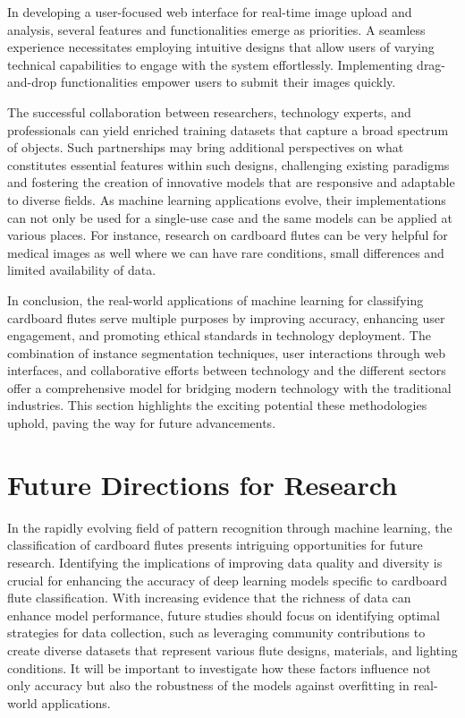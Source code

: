 In developing a user-focused web interface for real-time image upload and analysis, several features and functionalities emerge as priorities. A seamless experience necessitates employing intuitive designs that allow users of varying technical capabilities to engage with the system effortlessly. Implementing drag-and-drop functionalities empower users to submit their images quickly.

The successful collaboration between researchers, technology experts, and professionals can yield enriched training datasets that capture a broad spectrum of objects. Such partnerships may bring additional perspectives on what constitutes essential features within such designs, challenging existing paradigms and fostering the creation of innovative models that are responsive and adaptable to diverse fields. As machine learning applications evolve, their implementations can not only be used for a single-use case and the same models can be applied at various places. For instance, research on cardboard flutes can be very helpful for medical images as well where we can have rare conditions, small differences and limited availability of data.

In conclusion, the real-world applications of machine learning for classifying cardboard flutes serve multiple purposes by improving accuracy, enhancing user engagement, and promoting ethical standards in technology deployment. The combination of instance segmentation techniques, user interactions through web interfaces, and collaborative efforts between technology and the different sectors offer a comprehensive model for bridging modern technology with the traditional industries. This section highlights the exciting potential these methodologies uphold, paving the way for future advancements.


\section{Future Directions for Research}
In the rapidly evolving field of pattern recognition through machine learning, the classification of cardboard flutes presents intriguing opportunities for future research. Identifying the implications of improving data quality and diversity is crucial for enhancing the accuracy of deep learning models specific to cardboard flute classification. With increasing evidence that the richness of data can enhance model performance, future studies should focus on identifying optimal strategies for data collection, such as leveraging community contributions to create diverse datasets that represent various flute designs, materials, and lighting conditions. It will be important to investigate how these factors influence not only accuracy but also the robustness of the models against overfitting in real-world applications.

